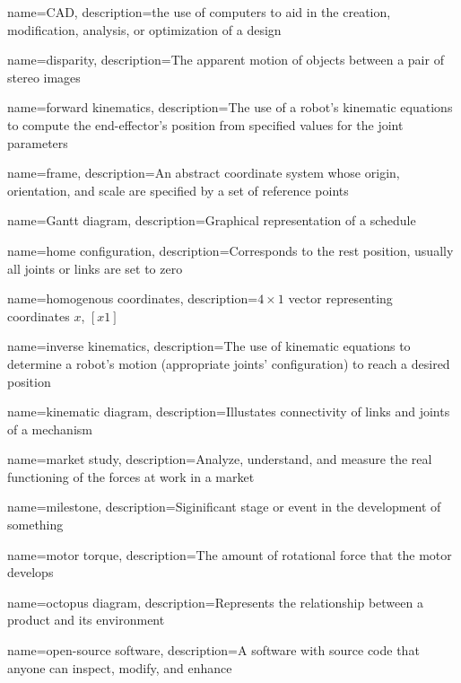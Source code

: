 \makeglossaries

{
    name=CAD,
    description={the use of computers to aid in the creation, modification, analysis, or optimization of a design}
}

{
    name=disparity,
    description={The apparent motion of objects between a pair of stereo images}
}

{
    name=forward kinematics,
    description={The use of a robot's kinematic equations to compute the end-effector's position from specified values for the joint parameters}
}

{
    name=frame,
    description={An abstract coordinate system whose origin, orientation, and scale are specified by a set of reference points}
}

{
    name=Gantt diagram,
    description={Graphical representation of a schedule}
}

{
    name=home configuration,
    description={Corresponds to the rest position, usually all joints or links are set to zero}
}

{
    name=homogenous coordinates,
    description={$4\times1$ vector representing coordinates $x$, $[x 1]$}
}

{
    name=inverse kinematics,
    description={The use of kinematic equations to determine a robot's motion (appropriate joints' configuration) to reach a desired position}
}

{
    name=kinematic diagram,
    description={Illustates connectivity of links and joints of a mechanism}
}

{
    name=market study,
    description={Analyze, understand, and measure the real functioning of the forces at work in a market}
}

{
    name=milestone,
    description={Siginificant stage or event in the development of something}
}

{
    name=motor torque,
    description={The amount of rotational force that the motor develops}
}

{
    name=octopus diagram,
    description={Represents the relationship between a product and its environment}
}

{
    name=open-source software,
    description={A software with source code that anyone can inspect, modify, and enhance}
}

